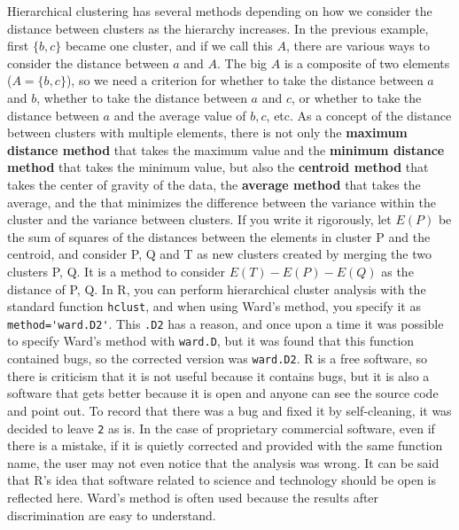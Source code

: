 \documentclass{ltjsbook}
\begin{document}
Hierarchical clustering has several methods depending on how we consider the distance between clusters as the hierarchy increases. In the previous example, first $\{b,c\}$ became one cluster, and if we call this $A$, there are various ways to consider the distance between $a$ and $A$. The big $A$ is a composite of two elements ($A=\{b,c\}$), so we need a criterion for whether to take the distance between $a$ and $b$, whether to take the distance between $a$ and $c$, or whether to take the distance between $a$ and the average value of $b, c$, etc. As a concept of the distance between clusters with multiple elements, there is not only the \textbf{maximum distance method} that takes the maximum value and the \textbf{minimum distance method} that takes the minimum value, but also the \textbf{centroid method} that takes the center of gravity of the data, the \textbf{average method} that takes the average, and the  that minimizes the difference between the variance within the cluster and the variance between clusters. If you write it rigorously, let $E(P)$ be the sum of squares of the distances between the elements in cluster P and the centroid, and consider P, Q and T as new clusters created by merging the two clusters P, Q. It is a method to consider $E(T)-E(P)-E(Q)$ as the distance of P, Q. In R, you can perform hierarchical cluster analysis with the standard function \verb|hclust|, and when using Ward's method, you specify it as \verb|method='ward.D2'|. This \verb|.D2| has a reason, and once upon a time it was possible to specify Ward's method with \verb|ward.D|, but it was found that this function contained bugs, so the corrected version was \verb|ward.D2|. R is a free software, so there is criticism that it is not useful because it contains bugs, but it is also a software that gets better because it is open and anyone can see the source code and point out. To record that there was a bug and fixed it by self-cleaning, it was decided to leave \verb|2| as is. In the case of proprietary commercial software, even if there is a mistake, if it is quietly corrected and provided with the same function name, the user may not even notice that the analysis was wrong. It can be said that R's idea that software related to science and technology should be open is reflected here. Ward's method is often used because the results after discrimination are easy to understand.
\end{document}
